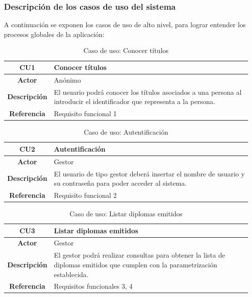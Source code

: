 \subsubsection{Descripción de los casos de uso del sistema}
A continuación se exponen los casos de uso de alto nivel, para lograr entender los procesos globales de la aplicación:

\begin{table}[!h]
	\begin{center}
		\begin{tabular}{|c|p{10cm}|}
		\hline \textbf{CU1} & Conocer títulos \\ 
		\hline \textbf{Actor} & Anónimo \\ 
		\hline \textbf{Descripción} & El usuario podrá conocer los títulos asociados a una persona al introducir el identificador que representa a la persona.  \\ 
		\hline \textbf{Referencia} & Requisito funcional 1 \\ 
		\hline 
		\end{tabular}
		\caption{Caso de uso: Conocer títulos}
		\label{tab:CU1}
	\end{center}
\end{table}

\begin{table}[!h]
	\begin{center}
		\begin{tabular}{|c|p{10cm}|}
		\hline \textbf{CU2} & Autentificación \\ 
		\hline \textbf{Actor} & Gestor\\ 
		\hline \textbf{Descripción} & El usuario de tipo gestor deberá insertar el nombre de usuario y su contraseña para poder acceder al sistema.\\ 
		\hline \textbf{Referencia} & Requisito funcional 2 \\ 
		\hline 
		\end{tabular}
		\caption{Caso de uso: Autentificación}
		\label{tab:CU2}
	\end{center}
\end{table}

\begin{table}[!h]
	\begin{center}
		\begin{tabular}{|c|p{10cm}|}
		\hline \textbf{CU3} & Listar diplomas emitidos \\ 
		\hline \textbf{Actor} & Gestor\\ 
		\hline \textbf{Descripción} & El gestor podrá realizar consultas para obtener la lista de diplomas emitidos que cumplen con la parametrización establecida. \\ 
		\hline \textbf{Referencia} & Requisitos funcionales 3, 4 \\ 
		\hline 
		\end{tabular}
		\caption{Caso de uso: Listar diplomas emitidos}
		\label{tab:CU3}
	\end{center}
\end{table}

